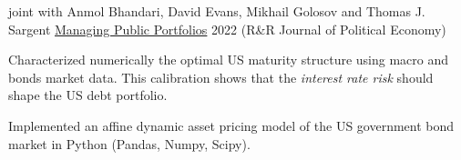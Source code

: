 

\begin{cventries}
	\cventry
	{joint with Anmol Bhandari, David Evans, Mikhail Golosov and Thomas J. Sargent} %
	{\href{https://static1.squarespace.com/static/54c19f18e4b0ef5f4b9f8dae/t/6328ee5213a65c43a48423f8/1663626851912/abegs4draft.pdf}{Managing Public Portfolios}}  %
	{2022} %
	{(R\&R Journal of Political Economy)} %
	{\begin{cvitems}
			\item Characterized numerically the optimal US maturity structure using macro and bonds market data. This calibration shows that the \textit{interest rate risk} should shape the US debt portfolio.
			\item Implemented an affine dynamic asset pricing model of the US government bond market in Python (Pandas, Numpy, Scipy).
		\end{cvitems}}
\end{cventries}
